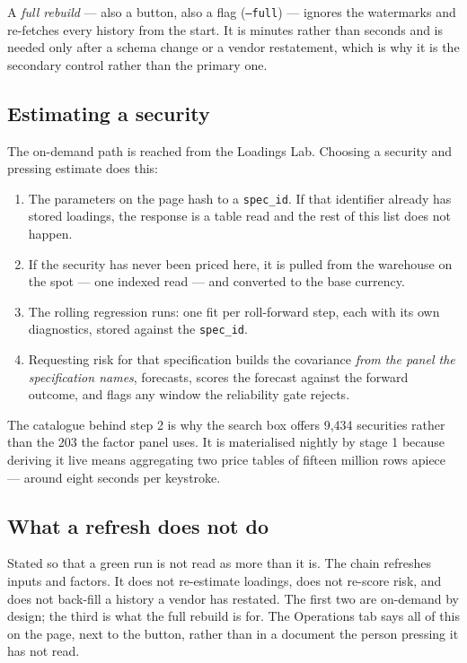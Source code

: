 \documentclass[11pt,a4paper]{article}
\newcommand{\code}[1]{\texttt{\small #1}}
\begin{document}
A \emph{full rebuild} --- also a button, also a flag (\code{--full}) --- ignores the
watermarks and re-fetches every history from the start. It is minutes rather than
seconds and is needed only after a schema change or a vendor restatement, which is
why it is the secondary control rather than the primary one.

\subsection{Estimating a security}

The on-demand path is reached from the Loadings Lab. Choosing a security and
pressing estimate does this:

\begin{enumerate}[leftmargin=1.6em,itemsep=0.35ex]
\item The parameters on the page hash to a \code{spec\_id}. If that identifier
  already has stored loadings, the response is a table read and the rest of this
  list does not happen.
\item If the security has never been priced here, it is pulled from the warehouse
  on the spot --- one indexed read --- and converted to the base currency.
\item The rolling regression runs: one fit per roll-forward step, each with its own
  diagnostics, stored against the \code{spec\_id}.
\item Requesting risk for that specification builds the covariance \emph{from the
  panel the specification names}, forecasts, scores the forecast against the
  forward outcome, and flags any window the reliability gate rejects.
\end{enumerate}

The catalogue behind step 2 is why the search box offers 9{,}434 securities rather
than the 203 the factor panel uses. It is materialised nightly by stage 1 because
deriving it live means aggregating two price tables of fifteen million rows apiece
--- around eight seconds per keystroke.

\subsection{What a refresh does not do}

Stated so that a green run is not read as more than it is. The chain refreshes
inputs and factors. It does not re-estimate loadings, does not re-score risk, and
does not back-fill a history a vendor has restated. The first two are on-demand by
design; the third is what the full rebuild is for. The Operations tab says all of
this on the page, next to the button, rather than in a document the person pressing
it has not read.
\end{document}
